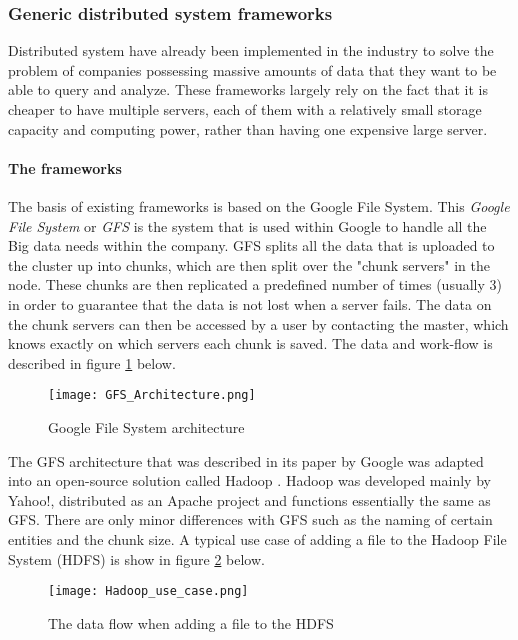 \subsubsection{Generic distributed system frameworks}
Distributed system have already been implemented in the industry to solve the problem of companies possessing massive amounts of data that they want to be able to query and analyze. These frameworks largely rely on the fact that it is cheaper
to have multiple servers, each of them with a relatively small storage capacity and computing power, rather than having one expensive large server.

\paragraph{The frameworks}
The basis of existing frameworks is based on the Google File System\cite{Ghem03}. This \textit{Google File System} or \textit{GFS} is the system that is used within Google to handle all the Big data needs within the company. GFS splits all the data that is uploaded to the cluster up into chunks, which are then split over the "chunk servers" in the node. These chunks are then replicated a predefined number of times (usually 3) in order to guarantee that the data is not lost when a server fails. The data on the chunk servers can then be accessed by a user by contacting the master, which knows exactly on which servers each chunk is saved.\cite{Ghem03} The data and work-flow is described in figure \ref{GFS_Architecture} below.

\begin{figure}
	\texttt{[image: GFS\_Architecture.png]}
	\caption{Google File System architecture\cite{Ghem03}}
	\label{GFS_Architecture}
\end{figure}

The GFS architecture that was described in its paper by Google was adapted into an open-source solution called Hadoop \cite{Shv10}. Hadoop was developed mainly by Yahoo!, distributed as an Apache project and functions essentially the same as GFS. There are only minor differences with GFS such as the naming of certain entities and the chunk size. A typical use case of adding a file to the Hadoop File System (HDFS) is show in figure \ref{Hadoop_usecase} below.

\begin{figure}
	\texttt{[image: Hadoop\_use\_case.png]}
	\caption{The data flow when adding a file to the HDFS\cite{Shv10}}
	\label{Hadoop_usecase}
\end{figure}

